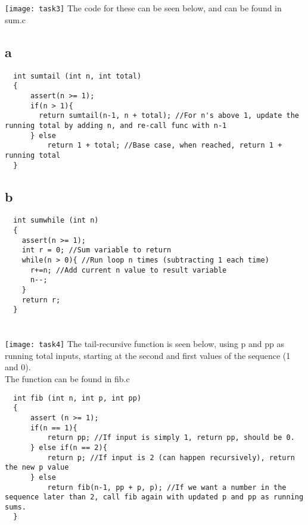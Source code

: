\documentclass{article}
\begin{document}
\section{}
\texttt{[image: task3]} 
The code for these can be seen below, and can be found in sum.c
\subsection*{a}
\begin{lstlisting}
  int sumtail (int n, int total)
  {
      assert(n >= 1);
      if(n > 1){
        return sumtail(n-1, n + total); //For n's above 1, update the running total by adding n, and re-call func with n-1
      } else
          return 1 + total; //Base case, when reached, return 1 + running total
  }
\end{lstlisting}
\subsection*{b}
\begin{lstlisting}
  int sumwhile (int n)
  {
    assert(n >= 1);
    int r = 0; //Sum variable to return
    while(n > 0){ //Run loop n times (subtracting 1 each time)
      r+=n; //Add current n value to result variable
      n--;
    }
    return r; 
  }
\end{lstlisting}


\section{}
\texttt{[image: task4]}
The tail-recursive function is seen below, using p and pp as running total inputs, starting at the second and first values of the sequence (1 and 0).\\
The function can be found in fib.c
\begin{lstlisting}
  int fib (int n, int p, int pp)
  {
      assert (n >= 1);
      if(n == 1){
          return pp; //If input is simply 1, return pp, should be 0.
      } else if(n == 2){
          return p; //If input is 2 (can happen recursively), return the new p value
      } else 
          return fib(n-1, pp + p, p); //If we want a number in the sequence later than 2, call fib again with updated p and pp as running sums.
  }
\end{lstlisting}
\end{document}
